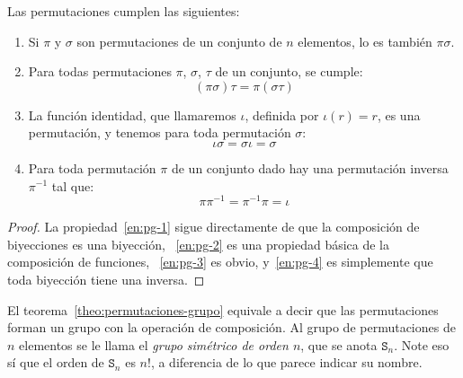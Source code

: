   \begin{theorem}
    \label{theo:permutaciones-grupo}
    Las permutaciones cumplen las siguientes:
    \begin{enumerate}[label = (\roman*), ref = (\roman*)]
    \item
      \label{en:pg-1}
      Si \(\pi\) y \(\sigma\)
      son permutaciones de un conjunto de \(n\) elementos,
      lo es también \(\pi \sigma\).
    \item
      \label{en:pg-2}
      Para todas permutaciones \(\pi\), \(\sigma\), \(\tau\)
      de un conjunto,
      se cumple:
      \begin{equation*}
	(\pi \sigma) \tau = \pi (\sigma \tau)
      \end{equation*}
    \item
      \label{en:pg-3}
      La función identidad,
      que llamaremos \(\iota\),
      definida por \(\iota(r) = r\),
      es una permutación,
      y tenemos para toda permutación \(\sigma\):
      \begin{equation*}
	\iota \sigma = \sigma \iota = \sigma
      \end{equation*}
    \item
      \label{en:pg-4}
      Para toda permutación \(\pi\) de un conjunto dado
      hay una permutación inversa
      \(\pi^{-1}\) tal que:
      \begin{equation*}
	\pi \pi^{-1} = \pi^{-1} \pi = \iota
      \end{equation*}
    \end{enumerate}
  \end{theorem}
  \begin{proof}
    La propiedad~\ref{en:pg-1}
    sigue directamente de que la composición de biyecciones
    es una biyección,~%
    \ref{en:pg-2}
    es una propiedad básica de la composición de funciones,~%
    \ref{en:pg-3} es obvio,
    y~\ref{en:pg-4}
    es simplemente que toda biyección tiene una inversa.
  \end{proof}

  El teorema~\ref{theo:permutaciones-grupo}
  equivale a decir que las permutaciones forman un grupo
  con la operación de composición.
  Al grupo de permutaciones de \(n\) elementos
  se le llama el \emph{grupo simétrico de orden \(n\)},%
  que se anota \(\mathtt{S}_n\).
  Note eso sí que el orden de \(\mathtt{S}_n\) es \(n!\),%
  a diferencia de lo que parece indicar su nombre.

